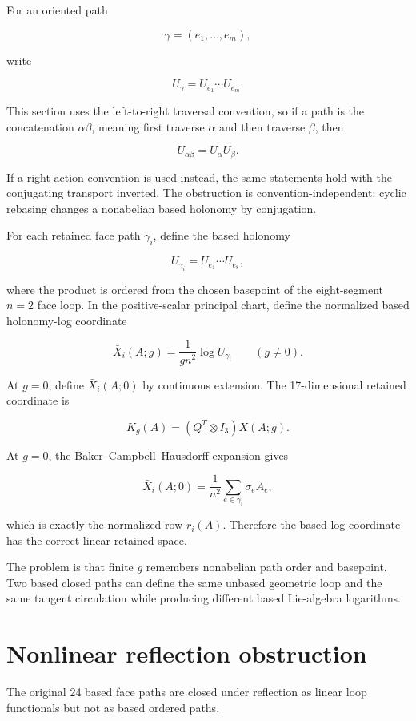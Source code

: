 \documentclass[10pt]{article}
\begin{document}
For an oriented path

\[
\gamma=(e_1,\ldots,e_m),
\]

write

\[
U_\gamma=U_{e_1}\cdots U_{e_m}.
\]

This section uses the left-to-right traversal convention, so if a path is the concatenation \(\alpha\beta\), meaning first traverse \(\alpha\) and then traverse \(\beta\), then

\[
U_{\alpha\beta}=U_\alpha U_\beta.
\]

If a right-action convention is used instead, the same statements hold with the conjugating transport inverted.  The obstruction is convention-independent: cyclic rebasing changes a nonabelian based holonomy by conjugation.

For each retained face path \(\gamma_i\), define the based holonomy

\[
U_{\gamma_i}=U_{e_1}\cdots U_{e_8},
\]

where the product is ordered from the chosen basepoint of the eight-segment \(n=2\) face loop.  In the positive-scalar principal chart, define the normalized based holonomy-log coordinate

\[
\bar X_i(A;g)=\frac1{gn^2}\log U_{\gamma_i}
\qquad (g\ne0).
\]

At \(g=0\), define \(\bar X_i(A;0)\) by continuous extension.  The 17-dimensional retained coordinate is

\[
K_g(A)=(Q^T\otimes I_3)\bar X(A;g).
\]

At \(g=0\), the Baker--Campbell--Hausdorff expansion gives

\[
\bar X_i(A;0)=\frac1{n^2}\sum_{e\in\gamma_i}\sigma_e A_e,
\]

which is exactly the normalized row \(r_i(A)\).  Therefore the based-log coordinate has the correct linear retained space.

The problem is that finite \(g\) remembers nonabelian path order and basepoint.  Two based closed paths can define the same unbased geometric loop and the same tangent circulation while producing different based Lie-algebra logarithms.

\section{Nonlinear reflection obstruction}

The original 24 based face paths are closed under reflection as linear loop functionals but not as based ordered paths.
\end{document}

